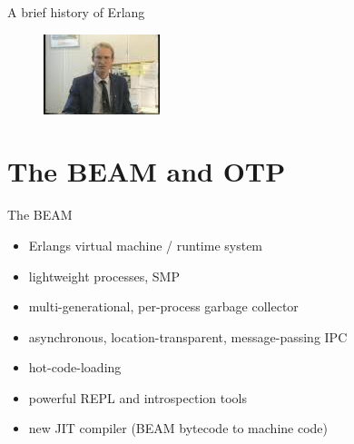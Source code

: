 \documentclass[
  ignorenonframetext,
  aspectratio=169]{beamer}
\providecommand{\tightlist}{%
  \setlength{\itemsep}{0pt}\setlength{\parskip}{0pt}}
\begin{document}
\begin{frame}{A brief history of Erlang}
\begin{figure}
\begin{minipage}{.24\textwidth}
\end{minipage}
\begin{minipage}{.24\textwidth}
  \centering
  \includegraphics[width=.9\linewidth]{./img/bjarne.jpg}
\end{minipage}
\end{figure}
\end{frame}

\section{The BEAM and OTP}\label{the-beam-and-otp}

\begin{frame}{The BEAM}
\label{the-beam}
\begin{itemize}
\tightlist
\item
  Erlang\textquotesingle s virtual machine / runtime system
\item
  lightweight processes, SMP
\item
  multi-generational, per-process garbage collector
\item
  asynchronous, location-transparent, message-passing IPC
\item
  hot-code-loading
\item
  powerful REPL and introspection tools
\item
  new JIT compiler (BEAM bytecode to machine code)
\end{itemize}
\end{frame}
\end{document}
